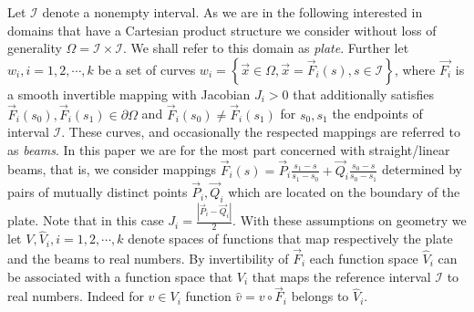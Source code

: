 \documentclass{marine_2015}
\begin{document}
Let $\mathcal{I}$ denote a nonempty interval. As we are in the following
interested in domains that have a Cartesian product structure we consider without
loss of generality $\Omega=\mathcal{I}\times\mathcal{I}$. We shall refer to this
domain as \textit{plate}. Further let $w_i, i=1, 2,\cdots, k$ be a set of curves 
$w_i=\left\{\vec{x}\in\Omega, \vec{x}=\vec{F}_i\left(s\right),
s\in\mathcal{I}\right\}$, where $\vec{F_i}$ is a smooth invertible mapping with
Jacobian $J_i>0$ that additionally satisfies $\vec{F}_i\left(s_0\right),
\vec{F}_i\left(s_1\right)\in\partial\Omega$ and
$\vec{F}_i\left(s_0\right) \neq \vec{F}_i\left(s_1\right)$ for $s_0, s_1$ the
endpoints of interval $\mathcal{I}$. These curves, and occasionally the
respected mappings are referred to as \textit{beams}. In this paper we are for the
most part concerned with straight/linear beams, that is, we consider mappings
$\vec{F}_i\left(s\right)=\vec{P}_i\tfrac{s_1-s}{s_1-s_0}+\vec{Q}_i\tfrac{s_0-s}{s_0-s_1}$
determined by pairs of mutually distinct points $\vec{P}_i, \vec{Q}_i$ which
are located on the boundary of the plate. Note that in this case
$J_i=\tfrac{\left|\vec{P}_i-\vec{Q}_i\right|}{2}$.
%
%
%
With these assumptions on geometry we let $V, \hat{V}_i, i=1, 2, \cdots, k$ denote
spaces of functions that map respectively the plate and the beams to real
numbers. By invertibility of $\vec{F}_i$ each function space $\hat{V}_i$ can be
associated with a function space that $V_{i}$ that maps the reference interval
$\mathcal{I}$ to real numbers. Indeed for $v\in V_i$ function
$\hat{v}=v\circ\vec{F}_i$ belongs to $\hat{V}_i$.
\end{document}
